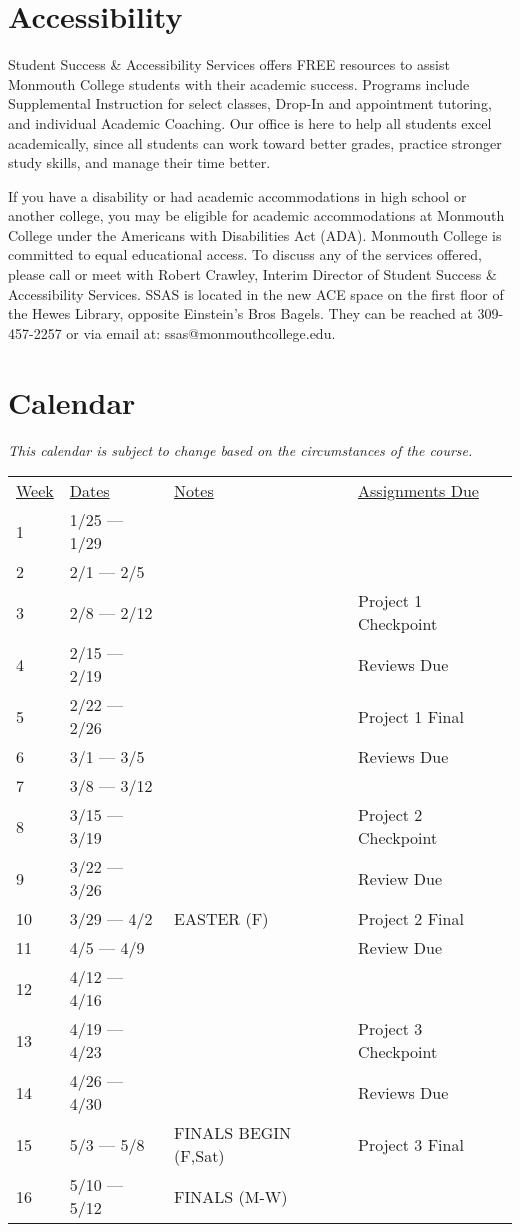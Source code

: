 \documentclass[10pt]{article}
\begin{document}
\section{Accessibility}

Student Success \& Accessibility Services offers FREE resources to assist Monmouth College students with their academic success. Programs include Supplemental Instruction for select classes, Drop-In and appointment tutoring, and individual Academic Coaching. Our office is here to help all students excel academically, since all students can work toward better grades, practice stronger study skills, and manage their time better.

If you have a disability or had academic accommodations in high school or another college, you may be eligible for academic accommodations at Monmouth College under the Americans with Disabilities Act (ADA). Monmouth College is committed to equal educational access. To discuss any of the services offered, please call or meet with Robert Crawley, Interim Director of Student Success \& Accessibility Services.  SSAS is located in the new ACE space on the first floor of the Hewes Library, opposite Einstein’s Bros Bagels. They can be reached at 309-457-2257 or via email at: ssas@monmouthcollege.edu.


\section{Calendar}

\textit{This calendar is subject to change based on the circumstances of the course.}

\begin{center}
\begin{tabular}{llll}
\underline{Week} & \underline{Dates} & \underline{Notes} & \underline{Assignments Due} \\
1 & 1/25 --- 1/29 &  & \\
2 & 2/1 --- 2/5 &  & \\
3 & 2/8 --- 2/12 &  & Project 1 Checkpoint\\
4 & 2/15 --- 2/19 & &  Reviews Due\\
5 & 2/22 --- 2/26 & &  Project 1 Final  \\
6 & 3/1 --- 3/5 & &   Reviews Due \\
7 & 3/8 --- 3/12 & &  \\
8 & 3/15 --- 3/19 & &  Project 2 Checkpoint   \\
9 & 3/22 --- 3/26 &  & Review Due \\
10 & 3/29 --- 4/2 & EASTER (F)  & Project 2 Final \\
11 & 4/5 --- 4/9 & & Review Due\\
12 & 4/12 --- 4/16 &  &  \\
13 & 4/19 --- 4/23 & & Project 3 Checkpoint \\
14 & 4/26 --- 4/30 & & Reviews Due  \\
15 & 5/3 --- 5/8 & FINALS BEGIN (F,Sat) & Project 3 Final \\
16 & 5/10 --- 5/12 & FINALS (M-W) &  \\
\end{tabular}
\end{center}
\end{document}
